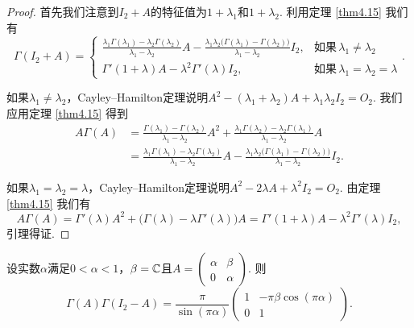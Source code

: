 \begin{proof}
  首先我们注意到$I_2+A$的特征值为$1+\lambda_1$和$1+\lambda_2$. 利用定理 \ref{thm4.15} 我们有
  \[
    \Gamma(I_2 + A) = \begin{cases}
      \frac{\lambda_1\Gamma(\lambda_1)-\lambda_2\Gamma(\lambda_2)}{\lambda_1-\lambda_2}
      A - \frac{\lambda_1\lambda_2\big( \Gamma(\lambda_1) - \Gamma(\lambda_2) \big)}{\lambda_1 - \lambda_2} I_2, & \text{如果}\, \lambda_1 \ne \lambda_2 \\
      \Gamma'(1+\lambda)A - \lambda^2\Gamma'(\lambda)I_2, & \text{如果}\, \lambda_1=\lambda_2=\lambda
    \end{cases}.
  \]

  如果$\lambda_1\ne\lambda_2$，Cayley--Hamilton定理说明$A^2-(\lambda_1+\lambda_2)A+\lambda_1\lambda_2I_2=O_2$. 我们应用定理 \ref{thm4.15} 得到
  \begin{align*}
    A\Gamma(A) & = \frac{\Gamma(\lambda_1)-\Gamma(\lambda_2)}{
        \lambda_1-\lambda_2}A^2 + \frac{
        \lambda_1\Gamma(\lambda_2)-\lambda_2
        \Gamma(\lambda_1)}{\lambda_1-\lambda_2}A \\
    & = \frac{\lambda_1\Gamma(\lambda_1)-\lambda_2\Gamma(\lambda_2)}{
        \lambda_1-\lambda_2}A - \frac{
        \lambda_1\lambda_2\big(\Gamma(\lambda_1)-
        \Gamma(\lambda_2)\big)}{\lambda_1-\lambda_2}I_2.
  \end{align*}

  如果$\lambda_1=\lambda_2=\lambda$，Cayley--Hamilton定理说明$A^2-2\lambda A+\lambda^2I_2=O_2$. 由定理 \ref{thm4.15} 我们有
  \[
    A\Gamma(A) = \Gamma'(\lambda) A^2 + \big( \Gamma(\lambda) - \lambda\Gamma'(\lambda)\big)A = \Gamma'(1+\lambda)A - \lambda^2\Gamma'(\lambda)I_2,
  \]
  引理得证.
\end{proof}

\begin{mybox}
  \begin{corollary}[两个Gamma函数称的乘积.]

    设实数$\alpha$满足$0<\alpha<1$，$\beta=\mathbb C$且$A=\begin{pmatrix}
      \alpha & \beta \\
      0 & \alpha
    \end{pmatrix}$. 则
    \[
      \Gamma(A) \Gamma(I_2 - A) = \frac\pi{\sin(\pi\alpha)}\begin{pmatrix}
        1 & - \pi\beta \cos(\pi\alpha) \\
        0 & 1
      \end{pmatrix}.
    \]
  \end{corollary}
\end{mybox}

